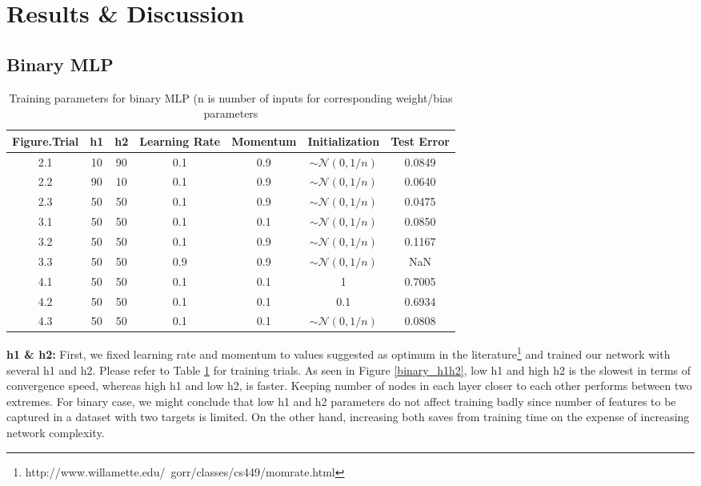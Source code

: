\documentclass[10pt]{article}
\begin{document}
\section{Results \& Discussion}

\subsection{Binary MLP}

\begin{table}[H]
\def\arraystretch{1.1}
\small
\center
    \begin{tabular}{| c | c | c | c | c | c | c |}
    \hline
    Figure.Trial & h1 & h2 & Learning Rate & Momentum & Initialization & Test Error \\ \hline \hline
    2.1 &10 & 90 & 0.1 & 0.9 & $\sim \mathcal{N} (0,1/n)$ & 0.0849  \\ \hline
    2.2 & 90 & 10 & 0.1 & 0.9 & $\sim \mathcal{N} (0,1/n)$ & 0.0640 \\ \hline
    2.3 & 50 & 50 & 0.1 & 0.9 & $\sim \mathcal{N} (0,1/n)$ & 0.0475 \\ \hline
    3.1 & 50 & 50 & 0.1 & 0.1 & $\sim \mathcal{N} (0,1/n)$ & 0.0850\\ \hline
    3.2 & 50 & 50 & 0.1 & 0.9 & $\sim \mathcal{N} (0,1/n)$ & 0.1167 \\ \hline
    3.3 & 50 & 50 & 0.9 & 0.9 & $\sim \mathcal{N} (0,1/n)$ & NaN  \\ \hline 
    4.1 & 50 & 50 & 0.1 & 0.1 & 1 & 0.7005 \\ \hline
    4.2 & 50 & 50 & 0.1 & 0.1 & 0.1 & 0.6934\\ \hline
    4.3 & 50 & 50 & 0.1 & 0.1 & $\sim \mathcal{N} (0,1/n)$ & 0.0808 \\ 
    \hline
    \end{tabular}
    \caption{Training parameters for binary MLP (n is number of inputs for corresponding weight/bias parameters}
    \label{parameters_binary}
\end{table}

\textbf{h1 \& h2:} First, we fixed learning rate and momentum to values suggested as optimum in the literature\footnote{http://www.willamette.edu/~gorr/classes/cs449/momrate.html} and trained our network with several h1 and h2. Please refer to Table \ref{parameters_binary} for training trials. As seen in Figure \ref{binary_h1h2}, low h1 and high h2 is the slowest in terms of convergence speed, whereas high h1 and low h2, is faster. Keeping number of nodes in each layer closer to each other performs between two extremes. For binary case, we might conclude that low h1 and h2 parameters do not affect training badly since number of features to be captured in a dataset with two targets is limited. On the other hand, increasing both saves from training time on the expense of increasing network complexity.
\end{document}
